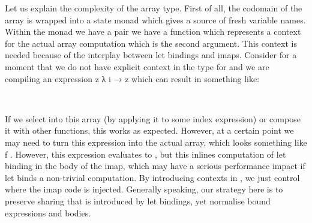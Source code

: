 Let us explain the complexity of the array type.  First of all, the codomain
of the array is wrapped into a state monad which gives a source of fresh variable
names.  Within the monad we have a pair we have a function which represents
a context for the actual array computation which is the second argument.
This context is needed because of the interplay between let bindings and
imaps.  Consider for a moment that we do not have explicit context in the
type for  and we are compiling an expression
 z \AF{:=}    λ i → z which can result in
something like:
\begin{code}%
%
\>[2]\AgdaSpace{}%
\AgdaSymbol{:}\AgdaSpace{}%
\AgdaSpace{}%
\AgdaSpace{}%
\AgdaSpace{}%
\AgdaSpace{}%
\AgdaSpace{}%
\<%
\\
%
\>[2]\AgdaSpace{}%
\AgdaSpace{}%
\AgdaSymbol{=}\AgdaSpace{}%
\AgdaSpace{}%
\AgdaSymbol{(}\AgdaSpace{}%
\AgdaOperator{\AgdaFunction{++}}\AgdaSpace{}%
\AgdaSpace{}%
\AgdaSpace{}%
\AgdaSpace{}%
\AgdaSymbol{)}\AgdaSpace{}%
\AgdaSymbol{)}\<%
\end{code}
If we select into this array (by applying it to some index expression)
or compose it with other functions, this works as expected.  However,
at a certain point we may need to turn this expression into the actual
array, which looks something like  \AF{++} f .
However, this expression evaluates to ,
but this inlines computation of let binding in the body of the imap,
which may have a serious performance impact if let binds a non-trivial
computation.  By introducing contexts in , we just control where
the imap code is injected.  Generally speaking, our strategy here is to
preserve sharing that is introduced by let bindings, yet normalise
bound expressions and bodies.

